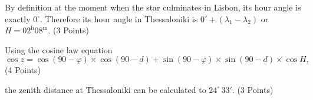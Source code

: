 By definition at the moment when the star culminates in Lisbon, its hour
angle is exactly $0^\circ$. Therefore its hour angle in Thessaloniki is
$0^\circ + (\lambda_1 - \lambda_2)$ or
$H = 02^{\mathrm{h}}08^{\mathrm{m}}$. \hfill(3 Points)

Using the cosine law equation
\[ \cos z = \cos(90-\varphi)\times\cos(90-d)
   + \sin(90-\varphi)\times\sin(90-d)\times\cos H, \]
\hfill(4 Points)

the zenith distance at Thessaloniki can be calculated to
$24^\circ\,33'$. \hfill(3 Points)
